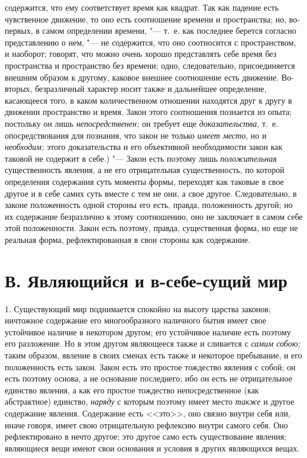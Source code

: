 содержится, что ему соответствует время как квадрат. Так как падение есть
чувственное движение, то оно есть соотношение времени и пространства; но,
во-первых, в самом определении времени, "--- т.~е. как последнее берется
согласно представлению о нем, "--- не содержится, что оно соотносится с
пространством, и наоборот; говорят, что можно очень хорошо представлять
себе время без пространства и пространство без времени; одно,
следовательно, присоединяется внешним образом к другому, каковое внешнее
соотношение есть движение. Во-вторых, безразличный характер носит также и
дальнейшее определение, касающееся того, в каком количественном отношении
находятся друг к другу в движении пространство и время. Закон этого
соотношения познается из опыта; постольку он лишь
{\em непосредственен;} он требует еще
{\em доказательства}, т.~е. опосредствования для
познания, что закон не только {\em имеет место}, но и
{\em необходим;} этого доказательства и его объективной
необходимости закон как таковой не содержит в себе.) "--- Закон есть поэтому
лишь {\em положительная} существенность явления, а не
его отрицательная существенность, по которой определения содержания суть
моменты формы, переходят как таковые в свое другое и в себе самих суть
вместе с тем не они, а свое другое. Следовательно, в законе положенность
одной стороны его есть, правда, положенность другой; но их содержание
безразлично к этому соотношению, оно не заключает в самом себе этой
положенности. Закон есть поэтому, правда, существенная форма, но еще не
реальная форма, рефлектированная в свои стороны как содержание.


\section[В. Являющийся и в-себе-сущий мир]{В. Являющийся и в-себе-сущий мир}

1. Существующий мир поднимается спокойно на
высоту царства законов; ничтожное содержание его многообразного наличного
бытия имеет свое устойчивое наличие в некотором другом; его устойчивое
наличие есть поэтому его разложение. Но в этом другом являющееся также и
сливается с {\em самим собою;} таким образом, явление в
своих сменах есть также и некоторое пребывание, и его положенность есть
закон. Закон есть это простое тождество явления с собой; он есть поэтому
основа, а не основание последнего; ибо он есть не отрицательное единство
явления, а как его простое тождество непосредственное (как абстрактное)
единство, {\em наряду} с которым поэтому имеет место
{\em также} и другое содержание явления. Содержание
есть <<это>>, оно связно внутри себя или, иначе говоря, имеет свою
отрицательную рефлексию внутри самого себя. Оно рефлектировано в нечто
другое; это другое само есть существование явления; являющиеся вещи имеют
свои основания и условия в других являющихся вещах.

